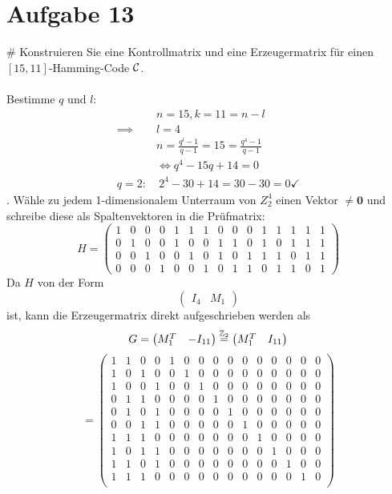 \section*{Aufgabe 13}
\begin{myList}
#
Konstruieren Sie eine Kontrollmatrix und eine Erzeugermatrix für einen $[15,11]$-Hamming-Code $\C$.\\\\
Bestimme $q$ und $l$:
\begin{align*}
&n=15, k=11=n-l\\
\implies& l = 4\\
&n=\frac{q^l-1}{q-1}=15 = \frac{q^4-1}{q-1} \\
&\iff q^4 - 15q + 14 = 0\\
q=2:&~ 2^4 - 30 + 14 = 30-30=0 \checkmark
\end{align*}
. Wähle zu jedem 1-dimensionalem Unterraum von $Z_2^4$ einen Vektor $\not= \mathbf 0$ und schreibe diese als Spaltenvektoren in die Prüfmatrix:\\
$$H=\begin{pmatrix}
1&0&0&0&1&1&1&0&0&0&1&1&1&1&1\\
0&1&0&0&1&0&0&1&1&0&1&0&1&1&1\\
0&0&1&0&0&1&0&1&0&1&1&1&0&1&1\\
0&0&0&1&0&0&1&0&1&1&0&1&1&0&1
\end{pmatrix}$$
Da $H$ von der Form
$$\begin{pmatrix}
I_4 & M_1
\end{pmatrix}$$
ist, kann die Erzeugermatrix direkt aufgeschrieben werden als
$$G=\begin{pmatrix}
 M_1^T & -I_{11}
\end{pmatrix}\overset{\Z_2}=\begin{pmatrix}
 M_1^T & I_{11}
\end{pmatrix}$$
$$=\begin{pmatrix}
1&1&0&0&1&0&0&0&0&0&0&0&0&0&0\\
1&0&1&0&0&1&0&0&0&0&0&0&0&0&0\\
1&0&0&1&0&0&1&0&0&0&0&0&0&0&0\\
0&1&1&0&0&0&0&1&0&0&0&0&0&0&0\\
0&1&0&1&0&0&0&0&1&0&0&0&0&0&0\\
0&0&1&1&0&0&0&0&0&1&0&0&0&0&0\\
1&1&1&0&0&0&0&0&0&0&1&0&0&0&0\\
1&0&1&1&0&0&0&0&0&0&0&1&0&0&0\\
1&1&0&1&0&0&0&0&0&0&0&0&1&0&0\\
1&1&1&0&0&0&0&0&0&0&0&0&0&1&0\\

\end{pmatrix}$$
\end{myList}
